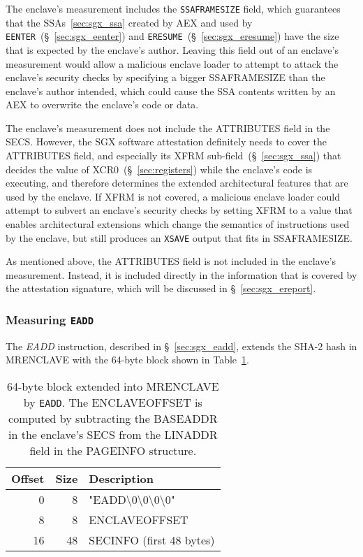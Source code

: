 The enclave's measurement includes the \texttt{SSAFRAMESIZE} field, which
guarantees that the SSAs~\ref{sec:sgx_ssa} created by AEX and used by
\texttt{EENTER}~(\S~\ref{sec:sgx_eenter}) and
\texttt{ERESUME}~(\S~\ref{sec:sgx_eresume}) have the size that is expected by
the enclave's author. Leaving this field out of an enclave's measurement would
allow a malicious enclave loader to attempt to attack the enclave's security
checks by specifying a bigger SSAFRAMESIZE than the enclave's author intended,
which could cause the SSA contents written by an AEX to overwrite the enclave's
code or data.

The enclave's measurement does not include the ATTRIBUTES field in the SECS.
However, the SGX software attestation definitely needs to cover the ATTRIBUTES
field, and especially its XFRM sub-field~(\S~\ref{sec:sgx_ssa}) that decides
the value of XCR0~(\S~\ref{sec:registers}) while the enclave's code is
executing, and therefore determines the extended architectural features that
are used by the enclave. If XFRM is not covered, a malicious enclave loader
could attempt to subvert an enclave's security checks by setting XFRM to a
value that enables architectural extensions which change the semantics of
instructions used by the enclave, but still produces an \texttt{XSAVE} output
that fits in SSAFRAMESIZE.

As mentioned above, the ATTRIBUTES field is not included in the enclave's
measurement. Instead, it is included directly in the information that is
covered by the attestation signature, which will be discussed in
\S~\ref{sec:sgx_ereport}.


\subsubsection{Measuring \texttt{EADD}}
\label{sec:sgx_eadd_mrenclave}


The \textit{EADD} instruction, described in \S~\ref{sec:sgx_eadd}, extends the
SHA-2 hash in MRENCLAVE with the 64-byte block shown in
Table~\ref{fig:eadd_mrenclave}.

\begin{table}[hbt]
  \centering
  \begin{tabularx}{\columnwidth}{| r | r | X |}
  \hline
  \textbf{Offset} & \textbf{Size} & \textbf{Description}\\
  \hline
  0 & 8 &
  "EADD\textbackslash{}0\textbackslash{}0\textbackslash{}0\textbackslash{}0" \\
  \hline
  8 & 8 & ENCLAVEOFFSET \\
  \hline
  16 & 48 & SECINFO (first 48 bytes) \\
  \hline
  \end{tabularx}
  \caption{
    64-byte block extended into MRENCLAVE by \texttt{EADD}. The ENCLAVEOFFSET
    is computed by subtracting the BASEADDR in the enclave's SECS from the
    LINADDR field in the PAGEINFO structure.
  }
  \label{fig:eadd_mrenclave}
\end{table}

